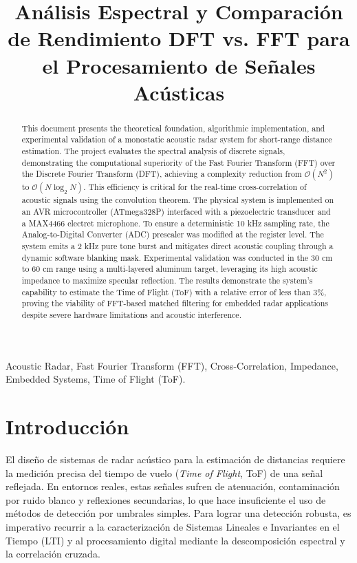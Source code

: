 \documentclass[conference]{IEEEtran}
\begin{document}
\title{Análisis Espectral y Comparación de Rendimiento DFT vs. FFT para el Procesamiento de Señales Acústicas}

\author{
}

\maketitle

\begin{abstract}
This document presents the theoretical foundation, algorithmic implementation, and experimental validation of a monostatic acoustic radar system for short-range distance estimation. The project evaluates the spectral analysis of discrete signals, demonstrating the computational superiority of the Fast Fourier Transform (FFT) over the Discrete Fourier Transform (DFT), achieving a complexity reduction from $\mathcal{O}(N^2)$ to $\mathcal{O}(N \log_2 N)$. This efficiency is critical for the real-time cross-correlation of acoustic signals using the convolution theorem. The physical system is implemented on an AVR microcontroller (ATmega328P) interfaced with a piezoelectric transducer and a MAX4466 electret microphone. To ensure a deterministic 10 kHz sampling rate, the Analog-to-Digital Converter (ADC) prescaler was modified at the register level. The system emits a 2 kHz pure tone burst and mitigates direct acoustic coupling through a dynamic software blanking mask. Experimental validation was conducted in the 30 cm to 60 cm range using a multi-layered aluminum target, leveraging its high acoustic impedance to maximize specular reflection. The results demonstrate the system's capability to estimate the Time of Flight (ToF) with a relative error of less than 3\%, proving the viability of FFT-based matched filtering for embedded radar applications despite severe hardware limitations and acoustic interference.
\end{abstract}

\begin{IEEEkeywords}
Acoustic Radar, Fast Fourier Transform (FFT), Cross-Correlation, Impedance, Embedded Systems, Time of Flight (ToF).
\end{IEEEkeywords}

\section{Introducción}
El diseño de sistemas de radar acústico para la estimación de distancias requiere la medición precisa del tiempo de vuelo (\textit{Time of Flight}, ToF) de una señal reflejada. En entornos reales, estas señales sufren de atenuación, contaminación por ruido blanco y reflexiones secundarias, lo que hace insuficiente el uso de métodos de detección por umbrales simples. Para lograr una detección robusta, es imperativo recurrir a la caracterización de Sistemas Lineales e Invariantes en el Tiempo (LTI) y al procesamiento digital mediante la descomposición espectral y la correlación cruzada.
\end{document}
